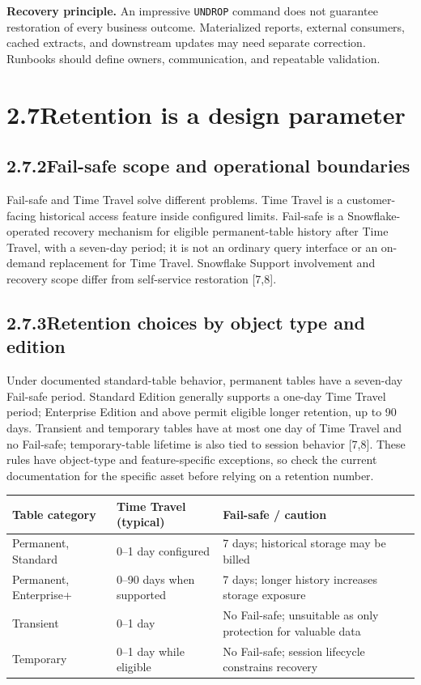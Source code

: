 \documentclass[11pt,twoside]{article}
\newcommand{\topic}[2]{\subsection*{#1\quad #2}}
\begin{document}
\textbf{Recovery principle.} An impressive \texttt{UNDROP} command does not guarantee restoration of every business outcome. Materialized reports, external consumers, cached extracts, and downstream updates may need separate correction. Runbooks should define owners, communication, and repeatable validation.

\newpage
\section*{2.7\quad Retention is a design parameter}
\topic{2.7.2}{Fail-safe scope and operational boundaries}
Fail-safe and Time Travel solve different problems. Time Travel is a customer-facing historical access feature inside configured limits. Fail-safe is a Snowflake-operated recovery mechanism for eligible permanent-table history after Time Travel, with a seven-day period; it is not an ordinary query interface or an on-demand replacement for Time Travel. Snowflake Support involvement and recovery scope differ from self-service restoration [7,8].

\topic{2.7.3}{Retention choices by object type and edition}
Under documented standard-table behavior, permanent tables have a seven-day Fail-safe period. Standard Edition generally supports a one-day Time Travel period; Enterprise Edition and above permit eligible longer retention, up to 90 days. Transient and temporary tables have at most one day of Time Travel and no Fail-safe; temporary-table lifetime is also tied to session behavior [7,8]. These rules have object-type and feature-specific exceptions, so check the current documentation for the specific asset before relying on a retention number.

\begin{center}\small
\begin{tabularx}{\linewidth}{@{}p{29mm}p{32mm}X@{}}\toprule
\textbf{Table category} & \textbf{Time Travel (typical)} & \textbf{Fail-safe / caution}\\\midrule
Permanent, Standard & 0--1 day configured & 7 days; historical storage may be billed\\
Permanent, Enterprise+ & 0--90 days when supported & 7 days; longer history increases storage exposure\\
Transient & 0--1 day & No Fail-safe; unsuitable as only protection for valuable data\\
Temporary & 0--1 day while eligible & No Fail-safe; session lifecycle constrains recovery\\
\bottomrule\end{tabularx}\end{center}
\end{document}
